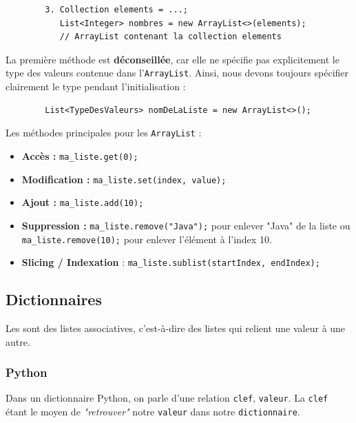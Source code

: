 \begin{enumerate}
\begin{verbatim}
        3. Collection elements = ...;
           List<Integer> nombres = new ArrayList<>(elements); 
           // ArrayList contenant la collection elements
    \end{verbatim}
    La première méthode est \textbf{déconseillée}, car elle ne spécifie pas explicitement le type des valeurs contenue dans l'\lstinline{ArrayList}. Ainsi, nous devons toujours spécifier clairement le type pendant l'initialisation :
    \begin{verbatim}
        List<TypeDesValeurs> nomDeLaListe = new ArrayList<>();
    \end{verbatim}
    Les méthodes principales pour les \lstinline{ArrayList} :
    \begin{itemize}
        \item \textbf{Accès :} \lstinline{ma_liste.get(0);}
        \item \textbf{Modification :} \lstinline{ma_liste.set(index, value);}
        \item \textbf{Ajout :} \lstinline{ma_liste.add(10);}
        \item \textbf{Suppression :} \lstinline{ma_liste.remove("Java");} pour enlever "Java" de la liste ou \lstinline{ma_liste.remove(10);} pour enlever l'élément à l'index 10.
        \item \textbf{Slicing / Indexation} : \lstinline{ma_liste.sublist(startIndex, endIndex);} 
\end{itemize}
\end{enumerate}



\subsection{Dictionnaires}
Les  sont des listes associatives, c'est-à-dire des listes qui relient une valeur à une autre.

\subsubsection{Python}
Dans un dictionnaire Python, on parle d'une relation \lstinline{clef}, \lstinline{valeur}. La \lstinline{clef} étant le moyen de \textit{"retrouver"} notre \lstinline{valeur} dans notre \lstinline{dictionnaire}.

